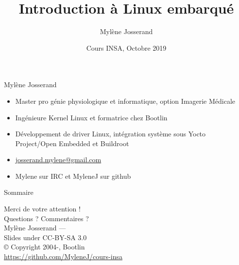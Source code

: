 \documentclass[aspectratio=169,obeyspaces,spaces,hyphens,dvipsnames]{beamer}
\title{Introduction à Linux embarqué}
\author[Mylène Josserand]
{Mylène Josserand}
\date[Octobre 2019]
{Cours INSA, Octobre 2019}
\institute[Bootlin]
\begin{document}
\begin{frame}
  \titlepage
\end{frame}

\begin{frame}{Mylène Josserand}
  \begin{itemize}
  \item Master pro génie physiologique et informatique, option Imagerie Médicale
  \item Ingénieure Kernel Linux et formatrice chez Bootlin
  \item Développement de driver Linux, intégration système sous Yocto Project/Open Embedded et Buildroot
  \item \url{josserand.mylene@gmail.com}
  \item Mylene sur IRC et MyleneJ sur github
  \end{itemize}
\end{frame}

\begin{frame}{Sommaire}
  \hspace{5cm}\tableofcontents
\end{frame}



\begin{frame}
  \begin{center}
    \Huge
    Merci de votre attention ! \\
    Questions ? Commentaires ?\\
    \vspace{1cm}
    \large
    Mylène Josserand — \\
    \vspace{1cm}
    Slides under CC-BY-SA 3.0\\
    © Copyright 2004-\the\year, Bootlin\\
    \scriptsize
    \url{https://github.com/MyleneJ/cours-insa}
  \end{center}
\end{frame}
\end{document}
